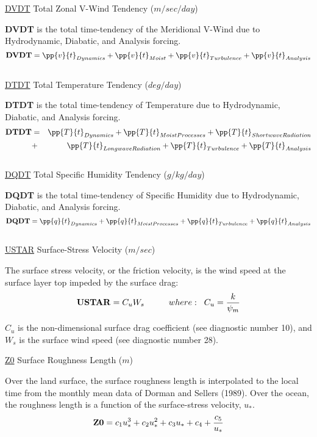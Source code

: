 \noindent
{ \underline {DVDT} Total Zonal V-Wind Tendency  ($m/sec/day$) }

\noindent
{\bf DVDT} is the total time-tendency of the Meridional V-Wind due to Hydrodynamic, Diabatic,
and Analysis forcing.
\[
{\bf DVDT} = \pp{v}{t}_{Dynamics} + \pp{v}{t}_{Moist} + \pp{v}{t}_{Turbulence} + \pp{v}{t}_{Analysis} 
\]
\\

\noindent
{ \underline {DTDT} Total Temperature Tendency  ($deg/day$) }

\noindent
{\bf DTDT} is the total time-tendency of Temperature due to Hydrodynamic, Diabatic,
and Analysis forcing.
\begin{eqnarray*}
{\bf DTDT} & = & \pp{T}{t}_{Dynamics} + \pp{T}{t}_{Moist Processes} + \pp{T}{t}_{Shortwave Radiation} \\
           & + & \pp{T}{t}_{Longwave Radiation} + \pp{T}{t}_{Turbulence} + \pp{T}{t}_{Analysis} 
\end{eqnarray*}
\\

\noindent
{ \underline {DQDT} Total Specific Humidity Tendency  ($g/kg/day$) }

\noindent
{\bf DQDT} is the total time-tendency of Specific Humidity due to Hydrodynamic, Diabatic,
and Analysis forcing.
\[
{\bf DQDT} = \pp{q}{t}_{Dynamics} + \pp{q}{t}_{Moist Processes} 
+ \pp{q}{t}_{Turbulence} + \pp{q}{t}_{Analysis} 
\]
\\
   
\noindent
{ \underline {USTAR}  Surface-Stress Velocity ($m/sec$) }

\noindent
The surface stress velocity, or the friction velocity, is the wind speed at 
the surface layer top impeded by the surface drag:
\[
{\bf USTAR} = C_uW_s \hspace{1cm}where: \hspace{.2cm} 
C_u = {k \over {\psi_m} }
\]

\noindent
$C_u$ is the non-dimensional surface drag coefficient (see diagnostic
number 10), and $W_s$ is the surface wind speed (see diagnostic number 28).
 
\noindent
{ \underline {Z0}  Surface Roughness Length ($m$) }

\noindent
Over the land surface, the surface roughness length is interpolated to the local
time from the monthly mean data of Dorman and Sellers (1989). Over the ocean,
the roughness length is a function of the surface-stress velocity, $u_*$.
\[
{\bf Z0} = c_1u^3_* + c_2u^2_* + c_3u_* + c_4 + {c_5 \over {u_*}}
\]

